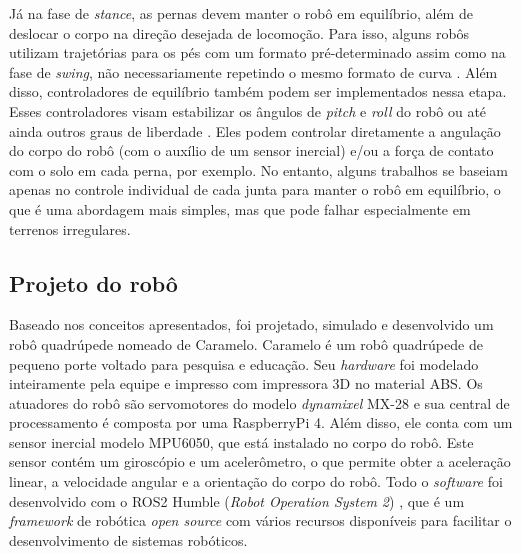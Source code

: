 \documentclass[../main.tex]{subfiles}
\begin{document}
Já na fase de \textit{stance}, as pernas devem manter o robô em equilíbrio, além de deslocar o corpo na direção desejada de locomoção. Para isso, alguns robôs utilizam trajetórias para os pés com um formato pré-determinado assim como na fase de \textit{swing}, não necessariamente repetindo o mesmo formato de curva \cite{X.118} \cite{X.58}. Além disso, controladores de equilíbrio também podem ser implementados nessa etapa. Esses controladores visam estabilizar os ângulos de \textit{pitch} e \textit{roll} do robô \cite{Shi2021} \cite{HackadayQuadruped} \cite{StanfordPupper} \cite{Notspot} ou até ainda outros graus de liberdade \cite{Chen2020140736} \cite{X.134} \cite{Zhang2016284}. Eles podem controlar diretamente a angulação do corpo do robô (com o auxílio de um sensor inercial) e/ou a força de contato com o solo em cada perna, por exemplo. No entanto, alguns trabalhos se baseiam apenas no controle individual de cada junta para manter o robô em equilíbrio, o que é uma abordagem mais simples, mas que pode falhar especialmente em terrenos irregulares.

\subsection{Projeto do robô}
Baseado nos conceitos apresentados, foi projetado, simulado e desenvolvido um robô quadrúpede nomeado de Caramelo. Caramelo é um robô quadrúpede de pequeno porte voltado para pesquisa e educação. Seu \textit{hardware} foi modelado inteiramente pela equipe e impresso com impressora 3D no material ABS. Os atuadores do robô são servomotores do modelo \textit{dynamixel} MX-28 e sua central de processamento é composta por uma RaspberryPi 4. Além disso, ele conta com um sensor inercial modelo MPU6050, que está instalado no corpo do robô. Este sensor contém um giroscópio e um acelerômetro, o que permite obter a aceleração linear, a velocidade angular e a orientação do corpo do robô. Todo o \textit{software} foi desenvolvido com o ROS2 Humble (\textit{Robot Operation System 2}) \cite{ROS2Humble}, que é um \textit{framework} de robótica \textit{open source} com vários recursos disponíveis para facilitar o desenvolvimento de sistemas robóticos.
\end{document}
